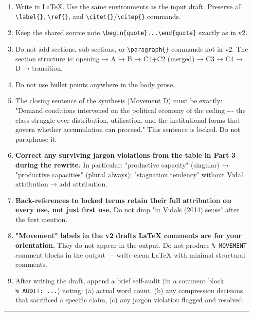 \begin{enumerate}
\def\labelenumi{\arabic{enumi}.}
\item
  Write in LaTeX. Use the same environments as the input draft. Preserve
  all \texttt{\textbackslash{}label\{\}},
  \texttt{\textbackslash{}ref\{\}}, and
  \texttt{\textbackslash{}citet\{\}}/\texttt{\textbackslash{}citep\{\}}
  commands.
\item
  Keep the shared source note
  \texttt{\textbackslash{}begin\{quote\}...\textbackslash{}end\{quote\}}
  exactly as in v2.
\item
  Do not add sections, sub-sections, or
  \texttt{\textbackslash{}paragraph\{\}} commands not in v2. The section
  structure is: opening → A → B → C1+C2 (merged) → C3 → C4 → D →
  transition.
\item
  Do not use bullet points anywhere in the body prose.
\item
  The closing sentence of the synthesis (Movement D) must be exactly:
  "Demand conditions intervened on the political economy of the ceiling
  -\/-\/- the class struggle over distribution, utilisation, and the
  institutional forms that govern whether accumulation can proceed."
  This sentence is locked. Do not paraphrase it.
\item
  \textbf{Correct any surviving jargon violations from the table in Part
  3 during the rewrite.} In particular: "productive capacity" (singular)
  → "productive capacities" (plural always); "stagnation tendency"
  without Vidal attribution → add attribution.
\item
  \textbf{Back-references to locked terms retain their full attribution
  on every use, not just first use.} Do not drop "in
  Vidal\textquotesingle s (2014) sense" after the first mention.
\item
  \textbf{"Movement" labels in the v2 draft\textquotesingle s LaTeX
  comments are for your orientation.} They do not appear in the output.
  Do not produce \texttt{\%\ MOVEMENT} comment blocks in the output ---
  write clean LaTeX with minimal structural comments.
\item
  After writing the draft, append a brief self-audit (in a comment block
  \texttt{\%\ AUDIT:\ ...}) noting: (a) actual word count, (b) any
  compression decisions that sacrificed a specific claim, (c) any jargon
  violation flagged and resolved.
\end{enumerate}

\begin{center}\rule{0.5\linewidth}{0.5pt}\end{center}

